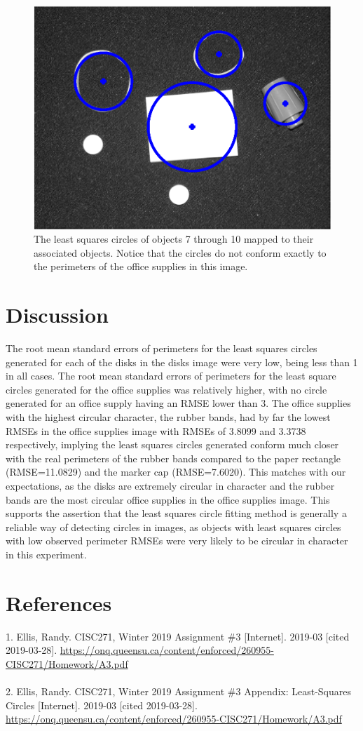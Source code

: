 \documentclass{article}
\begin{document}
	\begin{figure}[H]
		\centering
		\includegraphics{figure2}
		\caption{The least squares circles of objects 7 through 10 mapped to their associated objects. Notice that the circles do not conform exactly to the perimeters of the office supplies in this image.}
	\end{figure}
	\section*{Discussion}
	The root mean standard errors of perimeters for the least squares circles generated for each of the disks in the disks image were very low, being less than 1 in all cases. The root mean standard errors of perimeters for the least square circles generated for the office supplies was relatively higher, with no circle generated for an office supply having an RMSE lower than 3. The office supplies with the highest circular character, the rubber bands, had by far the lowest RMSEs in the office supplies image with RMSEs of 3.8099 and 3.3738 respectively, implying the least squares circles generated conform much closer with the real perimeters of the rubber bands compared to the paper rectangle (RMSE=11.0829) and the marker cap (RMSE=7.6020). This matches with our expectations, as the disks are extremely circular in character and the rubber bands are the most circular office supplies in the office supplies image. This supports the assertion that the least squares circle fitting method is generally a reliable way of detecting circles in images, as objects with least squares circles with low observed perimeter RMSEs were very likely to be circular in character in this experiment.
	\section*{References}
	1. Ellis, Randy. CISC271, Winter 2019 Assignment \#3 [Internet]. 2019-03 [cited 2019-03-28]. \url{https://onq.queensu.ca/content/enforced/260955-CISC271/Homework/A3.pdf}\\\\
	2. Ellis, Randy. CISC271, Winter 2019 Assignment \#3 Appendix: Least-Squares Circles [Internet]. 2019-03 [cited 2019-03-28]. \url{https://onq.queensu.ca/content/enforced/260955-CISC271/Homework/A3.pdf}
\end{document}
